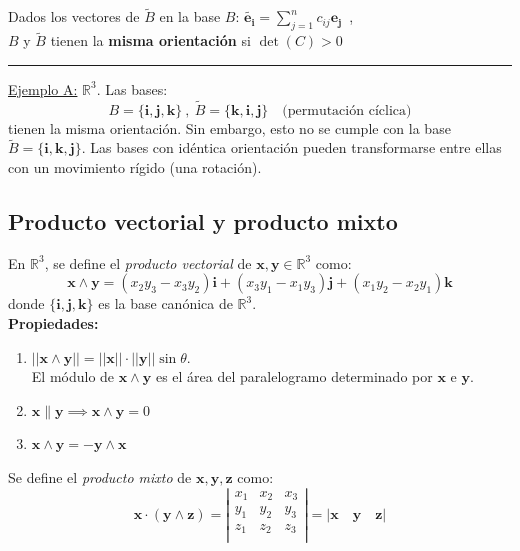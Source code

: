 \begin{mybox}
\begin{center}
Dados los vectores de $\tilde{B}$ en la base $B$:
$\tilde{\mathbf{e_i}}=\sum_{j=1}^nc_{ij}\mathbf{e_j}$\ ,\\
$B$ y $\tilde{B}$ tienen la \textbf{misma orientación} si $\det(C)>0$ \\
\noindent\rule{\textwidth}{0.5pt}
\end{center}
\underline{Ejemplo A:}
$\mathbb{R}^3$. Las bases:
$$
B=\{\mathbf{i,j,k}\} \ , \ \tilde{B}=\{ \mathbf{k,i,j}\} \quad \text{(permutación cíclica)}
$$ tienen la misma orientación.
Sin embargo, esto no se cumple con la base $\tilde{B}=\{ \mathbf{i,k,j}\}$. Las bases con idéntica orientación pueden transformarse entre ellas con un movimiento rígido (una rotación).
\end{mybox}
\subsection{Producto vectorial y producto mixto}

En $\mathbb{R}^3$, se define el \emph{producto vectorial} de $\mathbf{x,y}\in \mathbb{R}^3$ como:
$$
\mathbf{x} \wedge \mathbf{y}=(x_2y_3-x_3y_2)\mathbf{i}+(x_3y_1-x_1y_3)\mathbf{j}+(x_1y_2-x_2y_1)\mathbf{k}
$$
donde $\{ \mathbf{i,j,k}\}$ es la base canónica de $\mathbb{R}^3$.\\

\textbf{Propiedades:}
\begin{enumerate}
    \item $||\mathbf{x} \wedge \mathbf{y}||=||\mathbf{x}||\cdot ||\mathbf{y}|| \sin{\theta}$. \\
    El módulo de $\mathbf{x} \wedge \mathbf{y}$ es el área del paralelogramo determinado por $\mathbf{x}$ e $\mathbf{y}$. \\

    \item $\mathbf{x} \parallel \mathbf{y} \implies \mathbf{x}\wedge \mathbf{y}=0$\\

    \item $\mathbf{x}\wedge \mathbf{y}=-\mathbf{y}\wedge \mathbf{x}$\\
\end{enumerate}

Se define el \emph{producto mixto} de $\mathbf{x,y,z}$ como:
$$
\mathbf{x \cdot }(\mathbf{y}\wedge \mathbf{z})=\left |
\begin{array}{ccc}
    x_1 &x_2 &x_3  \\
    y_1 &y_2 &y_3  \\
    z_1 &z_2 &z_3  \\
\end{array}
\right |=|\mathbf{x \quad y \quad z}|
$$\\

